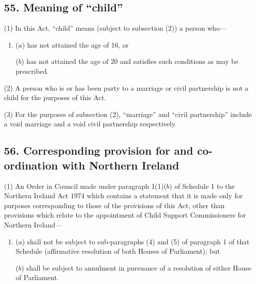 \documentclass[12pt,a4paper]{article}
\begin{document}
\subsection{55. Meaning of ``child''}

(1) In this Act, “child” means (subject to subsection (2)) a person who---
\begin{enumerate}\item[]
($a$) has not attained the age of 16, or

($b$) has not attained the age of 20 and satisfies such conditions as may be prescribed.
\end{enumerate}

(2)
A person who is or has been party to a marriage or civil partnership is not a child for the purposes of this Act.

(3)
For the purposes of subsection (2), “marriage” and “civil partnership” include a void marriage and a void civil partnership respectively.


\subsection{56. Corresponding provision for and co-ordination with Northern Ireland}

(1) An Order in Council made under paragraph 1(1)($b$) of Schedule 1 to the Northern Ireland Act 1974 which contains a statement that it is made only for purposes corresponding to those of the provisions of this Act, other than provisions which relate to the appointment of Child Support Commissioners for Northern Ireland---
\begin{enumerate}\item[]
($a$) shall not be subject to sub-paragraphs (4) and (5) of paragraph 1 of that Schedule (affirmative resolution of both Houses of Parliament); but

($b$) shall be subject to annulment in pursuance of a resolution of either House of Parliament.
\end{enumerate}
\end{document}
